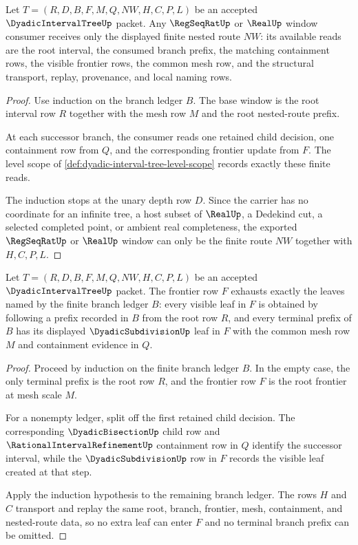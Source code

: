 \begin{theorem}
\label{thm:dyadic-interval-tree-window-exhaustion}
Let $T=(R,D,B,F,M,Q,NW,H,C,P,L)$ be an accepted $\DyadicIntervalTreeUp$ packet. Any $\RegSeqRatUp$ or $\RealUp$ window consumer receives only the displayed finite nested route $NW$: its available reads are the root interval, the consumed branch prefix, the matching containment rows, the visible frontier rows, the common mesh row, and the structural transport, replay, provenance, and local naming rows.
\end{theorem}
\begin{proof}
Use induction on the branch ledger $B$. The base window is the root interval row $R$ together with the mesh row $M$ and the root nested-route prefix.

At each successor branch, the consumer reads one retained child decision, one containment row from $Q$, and the corresponding frontier update from $F$. The level scope of \autoref{def:dyadic-interval-tree-level-scope} records exactly these finite reads.

The induction stops at the unary depth row $D$. Since the carrier has no coordinate for an infinite tree, a host subset of $\RealUp$, a Dedekind cut, a selected completed point, or ambient real completeness, the exported $\RegSeqRatUp$ or $\RealUp$ window can only be the finite route $NW$ together with $H,C,P,L$.
\end{proof}

\begin{theorem}
\label{thm:dyadic-interval-tree-frontier-exhaustion}
Let $T=(R,D,B,F,M,Q,NW,H,C,P,L)$ be an accepted $\DyadicIntervalTreeUp$ packet. The frontier row $F$ exhausts exactly the leaves named by the finite branch ledger $B$: every visible leaf in $F$ is obtained by following a prefix recorded in $B$ from the root row $R$, and every terminal prefix of $B$ has its displayed $\DyadicSubdivisionUp$ leaf in $F$ with the common mesh row $M$ and containment evidence in $Q$.
\end{theorem}
\begin{proof}
Proceed by induction on the finite branch ledger $B$. In the empty case, the only terminal prefix is the root row $R$, and the frontier row $F$ is the root frontier at mesh scale $M$.

For a nonempty ledger, split off the first retained child decision. The corresponding $\DyadicBisectionUp$ child row and $\RationalIntervalRefinementUp$ containment row in $Q$ identify the successor interval, while the $\DyadicSubdivisionUp$ row in $F$ records the visible leaf created at that step.

Apply the induction hypothesis to the remaining branch ledger. The rows $H$ and $C$ transport and replay the same root, branch, frontier, mesh, containment, and nested-route data, so no extra leaf can enter $F$ and no terminal branch prefix can be omitted.
\end{proof}

